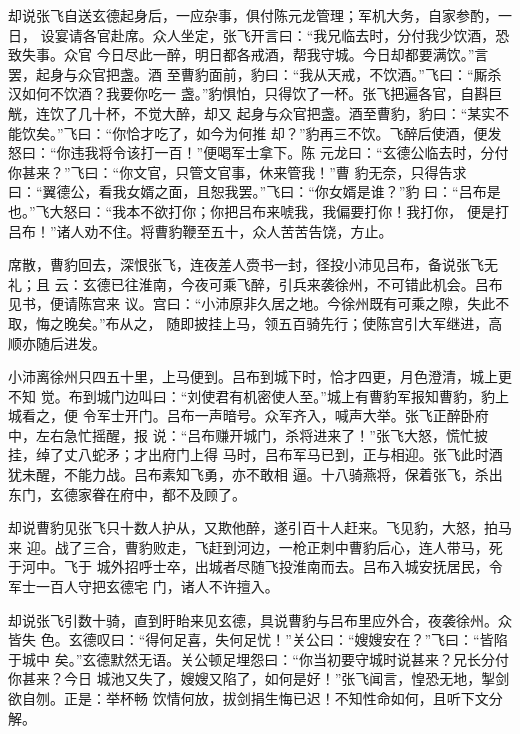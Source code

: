却说张飞自送玄德起身后，一应杂事，俱付陈元龙管理；军机大务，自家参酌，一日，
设宴请各官赴席。众人坐定，张飞开言曰：“我兄临去时，分付我少饮酒，恐致失事。众官
今日尽此一醉，明日都各戒酒，帮我守城。今日却都要满饮。”言罢，起身与众官把盏。酒
至曹豹面前，豹曰：“我从天戒，不饮酒。”飞曰：“厮杀汉如何不饮酒？我要你吃一
盏。”豹惧怕，只得饮了一杯。张飞把遍各官，自斟巨觥，连饮了几十杯，不觉大醉，却又
起身与众官把盏。酒至曹豹，豹曰：“某实不能饮矣。”飞曰：“你恰才吃了，如今为何推
却？”豹再三不饮。飞醉后使酒，便发怒曰：“你违我将令该打一百！”便喝军士拿下。陈
元龙曰：“玄德公临去时，分付你甚来？”飞曰：“你文官，只管文官事，休来管我！”曹
豹无奈，只得告求曰：“翼德公，看我女婿之面，且恕我罢。”飞曰：“你女婿是谁？”豹
曰：“吕布是也。”飞大怒曰：“我本不欲打你；你把吕布来唬我，我偏要打你！我打你，
便是打吕布！”诸人劝不住。将曹豹鞭至五十，众人苦苦告饶，方止。

席散，曹豹回去，深恨张飞，连夜差人赍书一封，径投小沛见吕布，备说张飞无礼；且
云：玄德已往淮南，今夜可乘飞醉，引兵来袭徐州，不可错此机会。吕布见书，便请陈宫来
议。宫曰：“小沛原非久居之地。今徐州既有可乘之隙，失此不取，悔之晚矣。”布从之，
随即披挂上马，领五百骑先行；使陈宫引大军继进，高顺亦随后进发。

小沛离徐州只四五十里，上马便到。吕布到城下时，恰才四更，月色澄清，城上更不知
觉。布到城门边叫曰：“刘使君有机密使人至。”城上有曹豹军报知曹豹，豹上城看之，便
令军士开门。吕布一声暗号。众军齐入，喊声大举。张飞正醉卧府中，左右急忙摇醒，报
说：“吕布赚开城门，杀将进来了！”张飞大怒，慌忙披挂，绰了丈八蛇矛；才出府门上得
马时，吕布军马已到，正与相迎。张飞此时酒犹未醒，不能力战。吕布素知飞勇，亦不敢相
逼。十八骑燕将，保着张飞，杀出东门，玄德家眷在府中，都不及顾了。

却说曹豹见张飞只十数人护从，又欺他醉，遂引百十人赶来。飞见豹，大怒，拍马来
迎。战了三合，曹豹败走，飞赶到河边，一枪正刺中曹豹后心，连人带马，死于河中。飞于
城外招呼士卒，出城者尽随飞投淮南而去。吕布入城安抚居民，令军士一百人守把玄德宅
门，诸人不许擅入。

却说张飞引数十骑，直到盱眙来见玄德，具说曹豹与吕布里应外合，夜袭徐州。众皆失
色。玄德叹曰：“得何足喜，失何足忧！”关公曰：“嫂嫂安在？”飞曰：“皆陷于城中
矣。”玄德默然无语。关公顿足埋怨曰：“你当初要守城时说甚来？兄长分付你甚来？今日
城池又失了，嫂嫂又陷了，如何是好！”张飞闻言，惶恐无地，掣剑欲自刎。正是：举杯畅
饮情何放，拔剑捐生悔已迟！不知性命如何，且听下文分解。